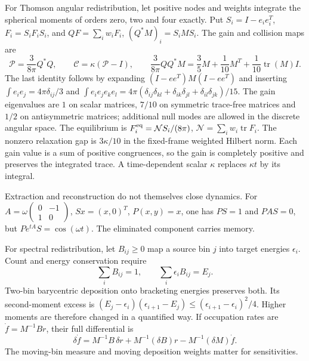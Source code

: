 For Thomson angular redistribution, let positive nodes and weights integrate the spherical moments of orders zero, two and four exactly. Put $S_i=I-e_ie_i^T$, $F_i=S_iF_iS_i$, and
$QF=\sum_iw_iF_i$, $(Q^*M)_i=S_iMS_i$. The gain and collision maps are
\begin{equation}
 \mathcal P=\frac{3}{8\pi}Q^*Q,\qquad
 \mathcal C=\kappa(\mathcal P-I),\qquad
 \frac{3}{8\pi}QQ^*M=\frac35M+\frac1{10}M^T+\frac1{10}\operatorname{tr}(M)I .
 \label{v:thomson_spectrum}
\end{equation}
The last identity follows by expanding $(I-ee^T)M(I-ee^T)$ and inserting
$\int e_ie_j=4\pi\delta_{ij}/3$ and
$\int e_ie_je_ke_l=4\pi(\delta_{ij}\delta_{kl}+\delta_{ik}\delta_{jl}+\delta_{il}\delta_{jk})/15$.
The gain eigenvalues are $1$ on scalar matrices, $7/10$ on symmetric trace-free matrices and $1/2$ on antisymmetric matrices; additional null modes are allowed in the discrete angular space. The equilibrium is
$F_i^{\rm eq}=\mathcal N S_i/(8\pi)$, $\mathcal N=\sum_iw_i\operatorname{tr}F_i$.
The nonzero relaxation gap is $3\kappa/10$ in the fixed-frame weighted Hilbert norm. Each gain value is a sum of positive congruences, so the gain is completely positive and preserves the integrated trace. A time-dependent scalar $\kappa$ replaces $\kappa t$ by its integral.

Extraction and reconstruction do not themselves close dynamics. For
$A=\omega\left(\begin{smallmatrix}0&-1\\1&0\end{smallmatrix}\right)$,
$Sx=(x,0)^T$, $P(x,y)=x$, one has $PS=1$ and $PAS=0$, but
$Pe^{tA}S=\cos(\omega t)$. The eliminated component carries memory.

For spectral redistribution, let $B_{ij}\ge0$ map a source bin $j$ into target energies $\epsilon_i$. Count and energy conservation require
\begin{equation}
 \sum_iB_{ij}=1,\qquad \sum_i\epsilon_iB_{ij}=E_j .
 \label{v:deposition}
\end{equation}
Two-bin barycentric deposition onto bracketing energies preserves both. Its second-moment excess is
$(E_j-\epsilon_i)(\epsilon_{i+1}-E_j)\le(\epsilon_{i+1}-\epsilon_i)^2/4$.
Higher moments are therefore changed in a quantified way. If occupation rates are $\dot f=M^{-1}Br$, their full differential is
\begin{equation}
 \delta\dot f=M^{-1}B\,\delta r+M^{-1}(\delta B)r-M^{-1}(\delta M)\dot f .
 \label{v:deposition_derivative}
\end{equation}
The moving-bin measure and moving deposition weights matter for sensitivities.

